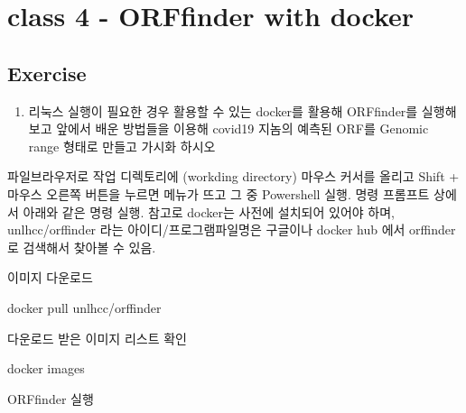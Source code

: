 \documentclass[
]{book}
\newenvironment{Shaded}{\begin{snugshade}}{\end{snugshade}}
\newcommand{\AttributeTok}[1]{\textcolor[rgb]{0.77,0.63,0.00}{#1}}
\newcommand{\ExtensionTok}[1]{#1}
\newcommand{\NormalTok}[1]{#1}
\newcommand{\VariableTok}[1]{\textcolor[rgb]{0.00,0.00,0.00}{#1}}
\providecommand{\tightlist}{%
  \setlength{\itemsep}{0pt}\setlength{\parskip}{0pt}}
\begin{document}
\hypertarget{day3_class4}{%
\section{class 4 - ORFfinder with docker}\label{day3_class4}}

\hypertarget{exercise-12}{%
\subsection{Exercise}\label{exercise-12}}

\begin{enumerate}
\def\labelenumi{\arabic{enumi}.}
\tightlist
\item
  리눅스 실행이 필요한 경우 활용할 수 있는 docker를 활용해 ORFfinder를 실행해보고 앞에서 배운 방법들을 이용해 covid19 지놈의 예측된 ORF를 Genomic range 형태로 만들고 가시화 하시오
\end{enumerate}

파일브라우저로 작업 디렉토리에 (workding directory) 마우스 커서를 올리고 Shift + 마우스 오른쪽 버튼을 누르면 메뉴가 뜨고 그 중 Powershell 실행. 명령 프롬프트 상에서 아래와 같은 명령 실행. 참고로 docker는 사전에 설치되어 있어야 하며, unlhcc/orffinder 라는 아이디/프로그램파일명은 구글이나 docker hub 에서 orffinder로 검색해서 찾아볼 수 있음.

이미지 다운로드

\begin{Shaded}
\begin{Highlighting}[]
\ExtensionTok{docker}\NormalTok{ pull unlhcc/orffinder}
\end{Highlighting}
\end{Shaded}

다운로드 받은 이미지 리스트 확인

\begin{Shaded}
\begin{Highlighting}[]
\ExtensionTok{docker}\NormalTok{ images}
\end{Highlighting}
\end{Shaded}

ORFfinder 실행

\begin{Shaded}
\end{Shaded}
\end{document}
